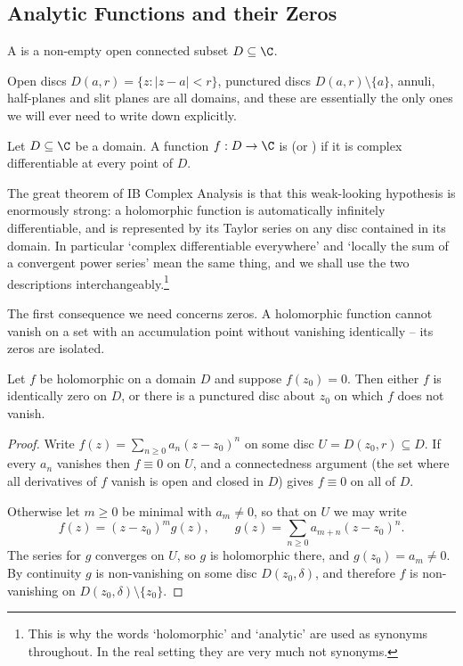 \subsection{Analytic Functions and their Zeros}

\begin{definition}[Domain]
	A  is a non-empty open connected subset $D \subseteq \C$.
\end{definition}

Open discs $D(a, r) = \{z : |z - a| < r\}$, punctured discs $D(a,r) \setminus \{a\}$,
annuli, half-planes and slit planes are all domains, and these are essentially the only
ones we will ever need to write down explicitly.

\begin{definition}
	Let $D \subseteq \C$ be a domain. A function $f: D \to \C$ is 
	(or ) if it is complex differentiable at every point of $D$.
\end{definition}

The great theorem of IB Complex Analysis is that this weak-looking hypothesis is
enormously strong: a holomorphic function is automatically infinitely differentiable,
and is represented by its Taylor series on any disc contained in its domain. In
particular `complex differentiable everywhere' and `locally the sum of a convergent
power series' mean the same thing, and we shall use the two descriptions
interchangeably.\footnote{This is why the words `holomorphic' and `analytic' are used
as synonyms throughout. In the real setting they are very much not synonyms.}

The first consequence we need concerns zeros. A holomorphic function cannot vanish on a
set with an accumulation point without vanishing identically -- its zeros are isolated.

\begin{proposition}\label{prop:isolatedzeros}
	Let $f$ be holomorphic on a domain $D$ and suppose $f(z_0) = 0$. Then either $f$ is
	identically zero on $D$, or there is a punctured disc about $z_0$ on which $f$ does
	not vanish.
\end{proposition}

\begin{proof}
	Write $f(z) = \sum_{n \geq 0} a_n (z - z_0)^n$ on some disc $U = D(z_0, r) \subseteq D$.
	If every $a_n$ vanishes then $f \equiv 0$ on $U$, and a connectedness argument (the set
	where all derivatives of $f$ vanish is open and closed in $D$) gives $f \equiv 0$ on all
	of $D$.

	Otherwise let $m \geq 0$ be minimal with $a_m \neq 0$, so that on $U$ we may write
	$$
	f(z) = (z - z_0)^m g(z), \qquad g(z) = \sum_{n \geq 0} a_{m + n}(z - z_0)^n.
	$$
	The series for $g$ converges on $U$, so $g$ is holomorphic there, and $g(z_0) = a_m \neq 0$.
	By continuity $g$ is non-vanishing on some disc $D(z_0, \delta)$, and therefore $f$ is
	non-vanishing on $D(z_0,\delta) \setminus \{z_0\}$.
\end{proof}

